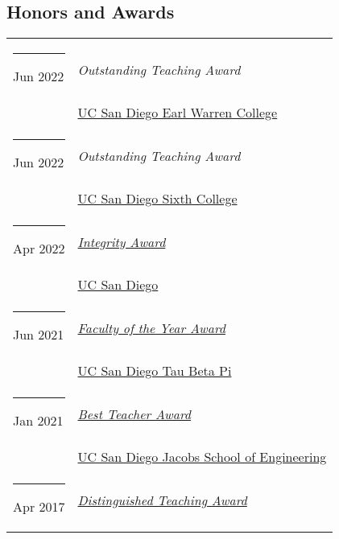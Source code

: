 \documentclass[margin,line]{res}
\begin{document}
\begin{resume}
\section{\sc Honors and Awards}
\begin{longtable}{@{}p{0.7in}p{4in}}
\hspace*{-4mm} \rule{-1mm}{5mm} Jun 2022 & \textit{Outstanding Teaching Award}\\*
\hspace*{-4mm} \hspace*{-4mm} & \hspace{4mm} \href{https://warren.ucsd.edu/}{UC San Diego Earl Warren College}\\
\hspace*{-4mm} \rule{-1mm}{5mm} Jun 2022 & \textit{Outstanding Teaching Award}\\*
\hspace*{-4mm} \hspace*{-4mm} & \hspace{4mm} \href{https://sixth.ucsd.edu/}{UC San Diego Sixth College}\\
\hspace*{-4mm} \rule{-1mm}{5mm} Apr 2022 & \href{https://academicintegrity.ucsd.edu/events/integrity-awards/index.html}{\textit{Integrity Award}}\\*
\hspace*{-4mm} \hspace*{-4mm} & \hspace{4mm} \href{https://www.ucsd.edu/}{UC San Diego}\\
\hspace*{-4mm} \rule{-1mm}{5mm} Jun 2021 & \href{https://tbp.ucsd.edu/home}{\textit{Faculty of the Year Award}}\\*
\hspace*{-4mm} \hspace*{-4mm} & \hspace{4mm} \href{https://tbp.ucsd.edu/home}{UC San Diego Tau Beta Pi}\\
\hspace*{-4mm} \rule{-1mm}{5mm} Jan 2021 & \href{https://jacobsschool.ucsd.edu/faculty/best-teacher-awards}{\textit{Best Teacher Award}}\\*
\hspace*{-4mm} \hspace*{-4mm} & \hspace{4mm} \href{https://jacobsschool.ucsd.edu/}{UC San Diego Jacobs School of Engineering}\\
\hspace*{-4mm} \rule{-1mm}{5mm} Apr 2017 & \href{https://senate.ucsd.edu/grants-awards/senate-awards/distinguished-teaching-award/recipient-history}{\textit{Distinguished Teaching Award}}\\*

\end{longtable}
\end{resume}
\end{document}
